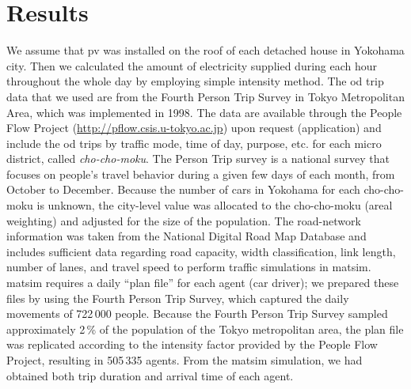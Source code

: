 \section{Results}
We assume that \gls{pv} was installed on the roof of each detached house in Yokohama city. Then we calculated the amount of electricity supplied during each hour throughout the whole day by employing simple intensity method. 
The \gls{od} trip data that we used are from the Fourth Person Trip Survey in Tokyo Metropolitan Area, which was implemented in 1998. The data are available through the People Flow Project (\url{http://pflow.csis.u-tokyo.ac.jp}) upon request (application) and include the \gls{od} trips by traffic mode, time of day, purpose, etc. for each micro district, called \emph{cho-cho-moku}. The Person Trip survey is a national survey that focuses on people's travel behavior during a given few days of each month, from October to December. Because the number of cars in Yokohama for each cho-cho-moku is unknown, the city-level value was allocated to the cho-cho-moku (areal weighting) and adjusted for the size of the population. The road-network information was taken from the National Digital Road Map Database and includes sufficient data regarding road capacity, width classification, link length, number of lanes, and travel speed to perform traffic simulations in \gls{matsim}. \gls{matsim} requires a daily ``plan file'' for each agent (car driver); we prepared these files by using the Fourth Person Trip Survey, which captured the daily movements of 722\,000 people. Because the Fourth Person Trip Survey sampled approximately 2\,\% of the population of the Tokyo metropolitan area, the plan file was replicated according to the intensity factor provided by the People Flow Project, resulting in 505\,335 agents. From the \gls{matsim} simulation, we had obtained both trip duration and arrival time of each agent. 

